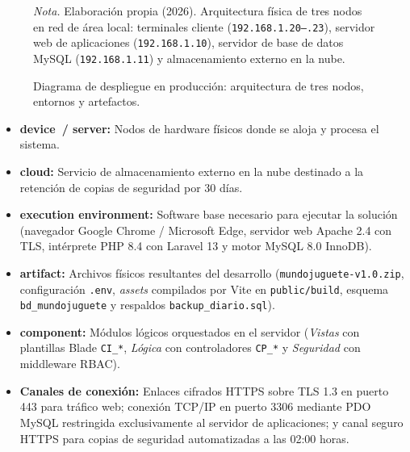 \documentclass[12pt,a4paper]{article}
\begin{document}
\begin{figure}[H]
  \caption{Diagrama de despliegue en producción: arquitectura de tres nodos, entornos y artefactos.}
  \label{fig:despliegue_produccion}
  \centering
  \resizebox{\linewidth}{!}{}
  \par\vspace{1ex}
  \raggedright\noindent\small \emph{Nota.} Elaboración propia (2026). Arquitectura física de tres nodos en red de área local: terminales cliente (\texttt{192.168.1.20--.23}), servidor web de aplicaciones (\texttt{192.168.1.10}), servidor de base de datos MySQL (\texttt{192.168.1.11}) y almacenamiento externo en la nube.
\end{figure}

\begin{itemize}
  \item \textbf{\guillemotleft device\guillemotright\ / \guillemotleft server\guillemotright:} Nodos de hardware físicos donde se aloja y procesa el sistema.
  \item \textbf{\guillemotleft cloud\guillemotright:} Servicio de almacenamiento externo en la nube destinado a la retención de copias de seguridad por 30 días.
  \item \textbf{\guillemotleft execution environment\guillemotright:} Software base necesario para ejecutar la solución (navegador Google Chrome / Microsoft Edge, servidor web Apache 2.4 con TLS, intérprete PHP 8.4 con Laravel 13 y motor MySQL 8.0 InnoDB).
  \item \textbf{\guillemotleft artifact\guillemotright:} Archivos físicos resultantes del desarrollo (\texttt{mundojuguete-v1.0.zip}, configuración \texttt{.env}, \emph{assets} compilados por Vite en \texttt{public/build}, esquema \texttt{bd\_mundojuguete} y respaldos \texttt{backup\_diario.sql}).
  \item \textbf{\guillemotleft component\guillemotright:} Módulos lógicos orquestados en el servidor (\emph{Vistas} con plantillas Blade \texttt{CI\_*}, \emph{Lógica} con controladores \texttt{CP\_*} y \emph{Seguridad} con middleware RBAC).
  \item \textbf{Canales de conexión:} Enlaces cifrados HTTPS sobre TLS 1.3 en puerto 443 para tráfico web; conexión TCP/IP en puerto 3306 mediante PDO MySQL restringida exclusivamente al servidor de aplicaciones; y canal seguro HTTPS para copias de seguridad automatizadas a las 02:00 horas.
\end{itemize}
\end{document}
